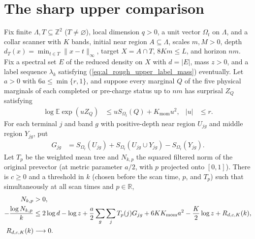 \section{The sharp upper comparison}

\begin{lemma}
    \label{thm:al_actual_sharp_upper}
    \leanok
    Fix finite $\Lambda,T\subseteq\mathbb Z^2$ ($T\ne\varnothing$), local
    dimension $q>0$, a unit vector $\Omega_t$ on $\Lambda$, and a collar
    scanner with $K$ bands, initial near region $A\subseteq\Lambda$, scales
    $m,M>0$, depth $d_T(x)=\min_{t\in T}\|x-t\|_\infty$, target $X=A\cap T$,
    $8Km\leq L$, and horizon $nm$. Fix a spectral set $E$ of the reduced
    density on $X$ with $d=|E|$, mass $z>0$, and a label sequence $\lambda_k$
    satisfying (\ref{eq:al_rough_upper_label_mass}) eventually. Let $a>0$ with
    $6a\leq\min\{r,1\}$, and suppose every marginal $Q$ of the five physical
    marginals of each completed or pre-charge status up to $nm$ has surprisal
    $Z_Q$ satisfying
    \begin{align}
        \log\mathbb E\exp(u Z_Q)
         & \leq uS_{\Omega_t}(Q)+K_{\mathrm{mom}}u^2,
         & |u|                                        & \leq r.
        \label{eq:al_actual_sharp_moments}
    \end{align}
    For each terminal $j$ and band $g$ with positive-depth near region $U_{jg}$
    and middle region $Y_{jg}$, put
    \begin{align}
        G_{jg}
         & =S_{\Omega_t}(U_{jg})+S_{\Omega_t}(U_{jg}\cup Y_{jg})
        -S_{\Omega_t}(Y_{jg}).
        \label{eq:al_actual_sharp_terminal_entropy}
    \end{align}
    Let $T_p$ be the weighted mean tree and $N_{k,p}$ the squared filtered norm
    of the original prevector (at metric parameter $a/2$, with $p$ projected
    onto $[0,1]$). There is $c\geq0$ and a threshold in $k$ (chosen before the
    scan time, $p$, and $T_p$) such that simultaneously at all scan times and
    $p\in\mathbb R$,
    \begin{align}
        N_{k,p}      & >0,\notag          \\
        -\frac{\log N_{k,p}}{k}
                     & \leq2\log d-\log z
        +\frac a2\sum_g\sum_jT_p(j)G_{jg}
        +6K K_{\mathrm{mom}}a^2-\frac K2\log z
        +R_{d,c,K}(k),
        \label{eq:al_actual_sharp_rate}   \\
        R_{d,c,K}(k) & \longrightarrow0.
        \label{eq:al_actual_sharp_remainder}
    \end{align}
\end{lemma}
